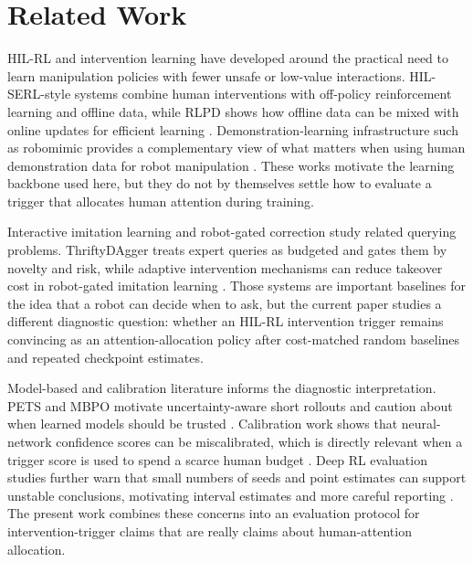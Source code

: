 \section{Related Work}

HIL-RL and intervention learning have developed around the practical need to learn manipulation policies with fewer unsafe or low-value interactions. HIL-SERL-style systems combine human interventions with off-policy reinforcement learning and offline data, while RLPD shows how offline data can be mixed with online updates for efficient learning \cite{luo2025hilserl,ball2023rlpd}. Demonstration-learning infrastructure such as robomimic provides a complementary view of what matters when using human demonstration data for robot manipulation \cite{mandlekar2021robomimic}. These works motivate the learning backbone used here, but they do not by themselves settle how to evaluate a trigger that allocates human attention during training.

Interactive imitation learning and robot-gated correction study related querying problems. ThriftyDAgger treats expert queries as budgeted and gates them by novelty and risk, while adaptive intervention mechanisms can reduce takeover cost in robot-gated imitation learning \cite{hoque2021thrifty,cai2025aim}. Those systems are important baselines for the idea that a robot can decide when to ask, but the current paper studies a different diagnostic question: whether an HIL-RL intervention trigger remains convincing as an attention-allocation policy after cost-matched random baselines and repeated checkpoint estimates.

Model-based and calibration literature informs the diagnostic interpretation. PETS and MBPO motivate uncertainty-aware short rollouts and caution about when learned models should be trusted \cite{chua2018pets,janner2019mbpo}. Calibration work shows that neural-network confidence scores can be miscalibrated, which is directly relevant when a trigger score is used to spend a scarce human budget \cite{guo2017calibration}. Deep RL evaluation studies further warn that small numbers of seeds and point estimates can support unstable conclusions, motivating interval estimates and more careful reporting \cite{henderson2018deeprlmatters,agarwal2021statisticalprecipice}. The present work combines these concerns into an evaluation protocol for intervention-trigger claims that are really claims about human-attention allocation.
